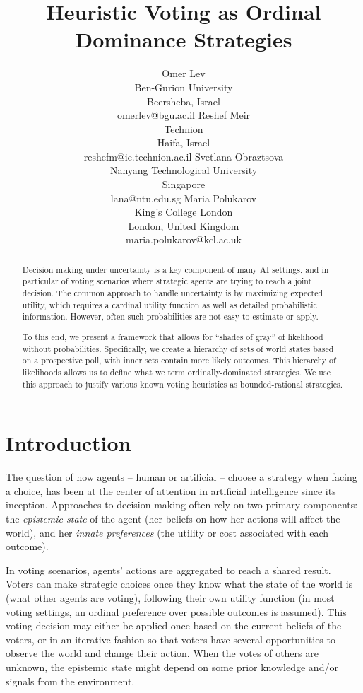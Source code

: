 \documentclass[letterpaper]{article} %
\title{Heuristic Voting as Ordinal Dominance Strategies}
\author{	 	
	Omer Lev\\Ben-Gurion University\\
	Beersheba, Israel\\ omerlev@bgu.ac.il
	\And
	Reshef Meir\\Technion\\Haifa, Israel\\ reshefm@ie.technion.ac.il
	\And
	Svetlana Obraztsova\\Nanyang Technological University\\Singapore\\lana@ntu.edu.sg
	\And
	Maria Polukarov\\King's College London\\London, United Kingdom\\maria.polukarov@kcl.ac.uk	
	}
\begin{document}
\maketitle
\begin{abstract}
Decision making under uncertainty is a key component of many AI settings, and in particular of voting scenarios where strategic agents are trying to reach a joint decision. The common approach to handle uncertainty is by maximizing expected utility, which requires a cardinal utility function as well as detailed probabilistic information. However, often such probabilities are not easy to estimate or apply.

To this end, we present a framework that allows for ``shades of gray'' of likelihood without probabilities. Specifically, we create a hierarchy of sets of world states based on a prospective poll, with inner sets contain more likely outcomes. This hierarchy of likelihoods allows us to define what we term ordinally-dominated strategies. We use this approach to justify various known voting heuristics as bounded-rational strategies.
\end{abstract}


\section{Introduction}\label{sec:intro}

The question of how agents -- human or artificial -- choose a strategy when facing a choice, has been at the center of attention in artificial intelligence since its inception. Approaches to decision making often rely on two primary components: the \emph{epistemic state} of the agent (her beliefs on how her actions will affect the world), and her \emph{innate preferences} (the utility or cost associated with each outcome). 

In voting scenarios, agents' actions are aggregated to reach a shared result. Voters can make strategic choices once they know what the state of the world is (what other agents are voting), following their own utility function (in most voting settings, an ordinal preference over possible outcomes is assumed). This voting decision may either be applied once based on the current beliefs of the voters, or in an iterative fashion so that voters have several opportunities to observe the world and change their action. When the votes of others are unknown, the epistemic state might depend on some prior knowledge and/or signals from the environment. 
\end{document}
